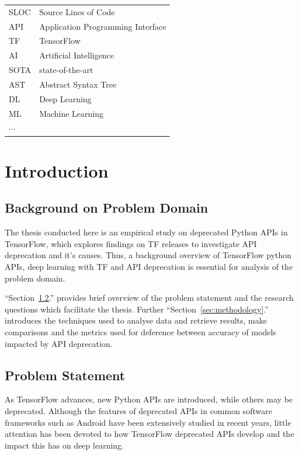 \documentclass[12pt,letterpaper]{report}
\begin{document}
\noindent\begin{tabular}{ll}
SLOC & Source Lines of Code\\
API & Application Programming Interface\\
TF & TensorFlow\\
AI & Artificial Intelligence\\
SOTA & state-of-the-art\\
AST & Abstract Syntax Tree\\
DL & Deep Learning\\
ML & Machine Learning\\
$\cdots$ & \\
\end{tabular}


\listoffigures{}


\listoftables{}

\chapter{Introduction}

\section{Background on Problem Domain}

The thesis conducted here is an empirical study on deprecated Python APIs in TensorFlow, which explores findings on TF releases to investigate API deprecation and it's causes. Thus, a background overview of TensorFlow python APIs, deep learning with TF and API deprecation is essential for analysis of the problem domain.

``Section~\ref{sec:problemstatement}.'' provides brief overview of the problem statement and the research questions which facilitate the thesis. Further ``Section~\ref{sec:methodology}.'' introduces the techniques used to analyse data and retrieve results, make comparisons and the metrics used for deference between accuracy of models impacted by API deprecation.

\section{Problem Statement} \label{sec:problemstatement}

As TensorFlow advances, new Python APIs are introduced, while others may be deprecated. Although the features of deprecated APIs in common software frameworks such as Android have been extensively studied in recent years, little attention has been devoted to how TensorFlow deprecated APIs develop and the impact this has on deep learning. 
\end{document}
